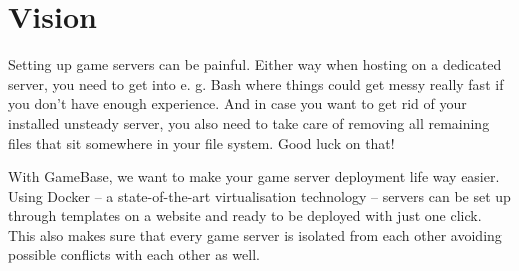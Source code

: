\documentclass[a4paper,12pt,chapterprefix=false,bibliography=totoc,listof=totoc,]{scrreprt}
\begin{document}
\section{Vision}
Setting up game servers can be painful. Either way when hosting on a dedicated server, you need to get into e. g. Bash where things could get messy really fast if you don't have enough experience. And in case you want to get rid of your installed unsteady server, you also need to take care of removing all remaining files that sit somewhere in your file system. Good luck on that!

With GameBase, we want to make your game server deployment life way easier. Using Docker – a state-of-the-art virtualisation technology – servers can be set up through templates on a website and ready to be deployed with just one click. This also makes sure that every game server is isolated from each other avoiding possible conflicts with each other as well.
\end{document}
